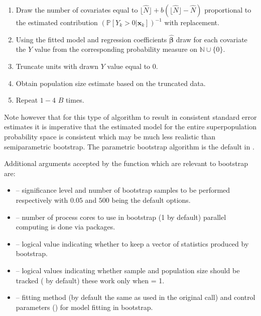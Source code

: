 \documentclass[
]{jss}
\newcommand{\1}{\mathcal{I}} \newcommand{\bx}{\boldsymbol{x}}
\begin{document}
\begin{enumerate}
    \item Draw the number of covariates equal to $\lfloor\hat{N}\rfloor+b\left(\lfloor\hat{N}\rfloor-\hat{N}\right)$ proportional to the estimated contribution $(\mathbb{P}\left[Y_{k}>0|\boldsymbol{x}_{k}\right])^{-1}$ with replacement.
    \item Using the fitted model and regression coefficients $\hat{\boldsymbol{\beta}}$ draw for each covariate the $Y$ value from the corresponding probability measure on $\mathbb{N}\cup\{0\}$.
    \item Truncate units with drawn $Y$ value equal to $0$.
    \item Obtain population size estimate based on the truncated data.
    \item Repeat $1-4$ $B$ times.
\end{enumerate}

Note however that for this type of algorithm to result in consistent
standard error estimates it is imperative that the estimated model for
the entire superpopulation probability space is consistent which may be
much less realistic than semiparametric bootstrap. The parametric
bootstrap algorithm is the default in .

Additional arguments accepted by the  function which
are relevant to bootstrap are:

\begin{itemize}
  \item {} -- significance level and number of bootstrap samples to be performed respectively with $0.05$ and $500$ being the default options.
  \item {} -- number of process cores to use in bootstrap (1 by default) parallel computing is done via  packages.
  \item {} --  logical value indicating whether to keep a vector of statistics produced by bootstrap.
  \item {} --  logical values indicating whether sample and population size should be tracked ( by default) these work only when  = 1.
    \item {} -- fitting method (by default the same as used in the original call) and control parameters () for model fitting in bootstrap.
\end{itemize}
\end{document}
